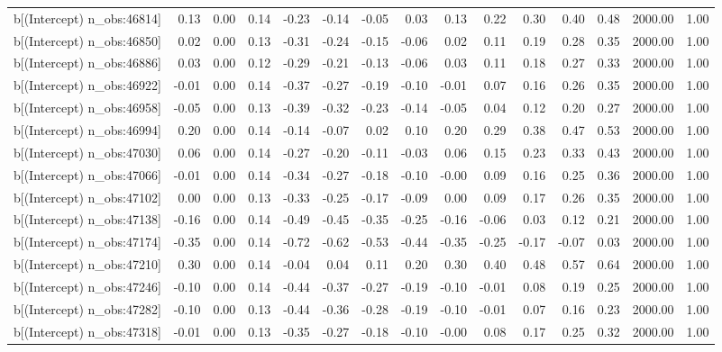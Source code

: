 \begin{table}[ht]
\begin{tabular}{rrrrrrrrrrrrrrr}
  b[(Intercept) n\_obs:46814] & 0.13 & 0.00 & 0.14 & -0.23 & -0.14 & -0.05 & 0.03 & 0.13 & 0.22 & 0.30 & 0.40 & 0.48 & 2000.00 & 1.00 \\ 
  b[(Intercept) n\_obs:46850] & 0.02 & 0.00 & 0.13 & -0.31 & -0.24 & -0.15 & -0.06 & 0.02 & 0.11 & 0.19 & 0.28 & 0.35 & 2000.00 & 1.00 \\ 
  b[(Intercept) n\_obs:46886] & 0.03 & 0.00 & 0.12 & -0.29 & -0.21 & -0.13 & -0.06 & 0.03 & 0.11 & 0.18 & 0.27 & 0.33 & 2000.00 & 1.00 \\ 
  b[(Intercept) n\_obs:46922] & -0.01 & 0.00 & 0.14 & -0.37 & -0.27 & -0.19 & -0.10 & -0.01 & 0.07 & 0.16 & 0.26 & 0.35 & 2000.00 & 1.00 \\ 
  b[(Intercept) n\_obs:46958] & -0.05 & 0.00 & 0.13 & -0.39 & -0.32 & -0.23 & -0.14 & -0.05 & 0.04 & 0.12 & 0.20 & 0.27 & 2000.00 & 1.00 \\ 
  b[(Intercept) n\_obs:46994] & 0.20 & 0.00 & 0.14 & -0.14 & -0.07 & 0.02 & 0.10 & 0.20 & 0.29 & 0.38 & 0.47 & 0.53 & 2000.00 & 1.00 \\ 
  b[(Intercept) n\_obs:47030] & 0.06 & 0.00 & 0.14 & -0.27 & -0.20 & -0.11 & -0.03 & 0.06 & 0.15 & 0.23 & 0.33 & 0.43 & 2000.00 & 1.00 \\ 
  b[(Intercept) n\_obs:47066] & -0.01 & 0.00 & 0.14 & -0.34 & -0.27 & -0.18 & -0.10 & -0.00 & 0.09 & 0.16 & 0.25 & 0.36 & 2000.00 & 1.00 \\ 
  b[(Intercept) n\_obs:47102] & 0.00 & 0.00 & 0.13 & -0.33 & -0.25 & -0.17 & -0.09 & 0.00 & 0.09 & 0.17 & 0.26 & 0.35 & 2000.00 & 1.00 \\ 
  b[(Intercept) n\_obs:47138] & -0.16 & 0.00 & 0.14 & -0.49 & -0.45 & -0.35 & -0.25 & -0.16 & -0.06 & 0.03 & 0.12 & 0.21 & 2000.00 & 1.00 \\ 
  b[(Intercept) n\_obs:47174] & -0.35 & 0.00 & 0.14 & -0.72 & -0.62 & -0.53 & -0.44 & -0.35 & -0.25 & -0.17 & -0.07 & 0.03 & 2000.00 & 1.00 \\ 
  b[(Intercept) n\_obs:47210] & 0.30 & 0.00 & 0.14 & -0.04 & 0.04 & 0.11 & 0.20 & 0.30 & 0.40 & 0.48 & 0.57 & 0.64 & 2000.00 & 1.00 \\ 
  b[(Intercept) n\_obs:47246] & -0.10 & 0.00 & 0.14 & -0.44 & -0.37 & -0.27 & -0.19 & -0.10 & -0.01 & 0.08 & 0.19 & 0.25 & 2000.00 & 1.00 \\ 
  b[(Intercept) n\_obs:47282] & -0.10 & 0.00 & 0.13 & -0.44 & -0.36 & -0.28 & -0.19 & -0.10 & -0.01 & 0.07 & 0.16 & 0.23 & 2000.00 & 1.00 \\ 
  b[(Intercept) n\_obs:47318] & -0.01 & 0.00 & 0.13 & -0.35 & -0.27 & -0.18 & -0.10 & -0.00 & 0.08 & 0.17 & 0.25 & 0.32 & 2000.00 & 1.00 \\ 

\end{tabular}
\end{table}

